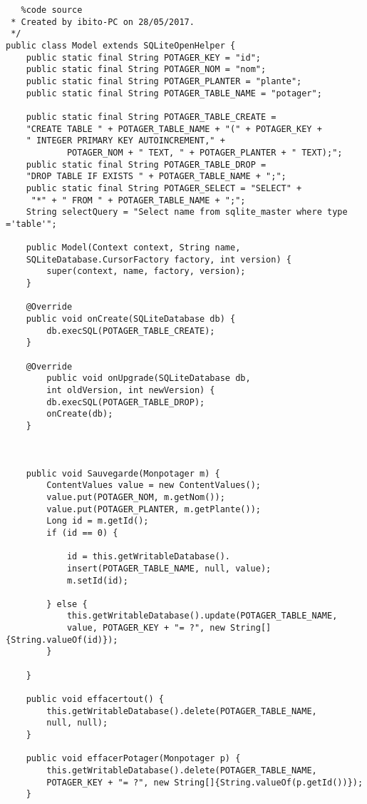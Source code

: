 		\begin{lstlisting}
   %code source
 * Created by ibito-PC on 28/05/2017.
 */
public class Model extends SQLiteOpenHelper {
    public static final String POTAGER_KEY = "id";
    public static final String POTAGER_NOM = "nom";
    public static final String POTAGER_PLANTER = "plante";
    public static final String POTAGER_TABLE_NAME = "potager";

    public static final String POTAGER_TABLE_CREATE = 
    "CREATE TABLE " + POTAGER_TABLE_NAME + "(" + POTAGER_KEY + 
    " INTEGER PRIMARY KEY AUTOINCREMENT," +
            POTAGER_NOM + " TEXT, " + POTAGER_PLANTER + " TEXT);";
    public static final String POTAGER_TABLE_DROP = 
    "DROP TABLE IF EXISTS " + POTAGER_TABLE_NAME + ";";
    public static final String POTAGER_SELECT = "SELECT" +
     "*" + " FROM " + POTAGER_TABLE_NAME + ";";
    String selectQuery = "Select name from sqlite_master where type ='table'";

    public Model(Context context, String name, 
    SQLiteDatabase.CursorFactory factory, int version) {
        super(context, name, factory, version);
    }

    @Override
    public void onCreate(SQLiteDatabase db) {
        db.execSQL(POTAGER_TABLE_CREATE);
    }

    @Override
        public void onUpgrade(SQLiteDatabase db, 
        int oldVersion, int newVersion) {
        db.execSQL(POTAGER_TABLE_DROP);
        onCreate(db);
    }



    public void Sauvegarde(Monpotager m) {
        ContentValues value = new ContentValues();
        value.put(POTAGER_NOM, m.getNom());
        value.put(POTAGER_PLANTER, m.getPlante());
        Long id = m.getId();
        if (id == 0) {

            id = this.getWritableDatabase().
            insert(POTAGER_TABLE_NAME, null, value);
            m.setId(id);

        } else {
            this.getWritableDatabase().update(POTAGER_TABLE_NAME, 
            value, POTAGER_KEY + "= ?", new String[]{String.valueOf(id)});
        }

    }

    public void effacertout() {
        this.getWritableDatabase().delete(POTAGER_TABLE_NAME, 
        null, null);
    }

    public void effacerPotager(Monpotager p) {
        this.getWritableDatabase().delete(POTAGER_TABLE_NAME, 
        POTAGER_KEY + "= ?", new String[]{String.valueOf(p.getId())});
    }


\end{lstlisting}
